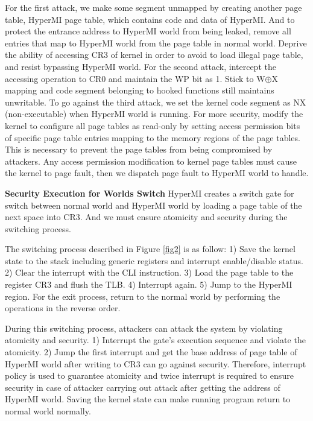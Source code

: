 \documentclass[conference]{IEEEtran}
\begin{document}
For the first attack, we make some segment unmapped by creating another page table, HyperMI page table, which contains code and data of HyperMI. And to protect the entrance address to HyperMI world from being leaked,
remove all entries that map to HyperMI world from the page table in normal world. Deprive the ability of accessing CR3 of kernel in order to avoid to load illegal page table, and resist bypassing HyperMI world.
For the second attack, intercept the accessing operation to CR0 and maintain the WP bit as 1. Stick to W$\oplus${X} mapping and code segment belonging to hooked functions still maintains unwritable.
To go against the third attack, we set the kernel code segment as NX (non-executable) when HyperMI world is running. For more security, modify the kernel to configure all page tables as read-only by setting access permission bits of specific page table entries mapping to the memory regions of the page tables. This is necessary to prevent the page tables from being compromised by attackers. Any access permission modification to kernel page tables must cause the kernel to page fault, then we dispatch page fault to HyperMI world to handle.


\textbf{Security Execution for Worlds Switch}
HyperMI creates a switch gate for switch between normal world and HyperMI world by loading a page table of the next space into CR3. And we must ensure atomicity and security during the switching process.

The switching process described in Figure \ref{fig2} is as follow: 1) Save the kernel state to the stack including generic registers and interrupt enable/disable status. 2) Clear the interrupt with the CLI instruction. 3) Load the page table to the register CR3 and flush the TLB. 4) Interrupt again. 5) Jump to the HyperMI region. For the exit process, return to the normal world by performing the operations in the reverse order.

During this switching process, attackers can attack the system by violating atomicity and security. 1) Interrupt the gate's execution sequence and violate the atomicity. 2) Jump the first interrupt and get the base address of page table of HyperMI world after writing to CR3 can go against security. Therefore, interrupt policy is used to guarantee atomicity and twice interrupt is required to ensure security in case of attacker carrying out attack after getting the address of HyperMI world. Saving the kernel state can make running program return to normal world normally. 
\end{document}

